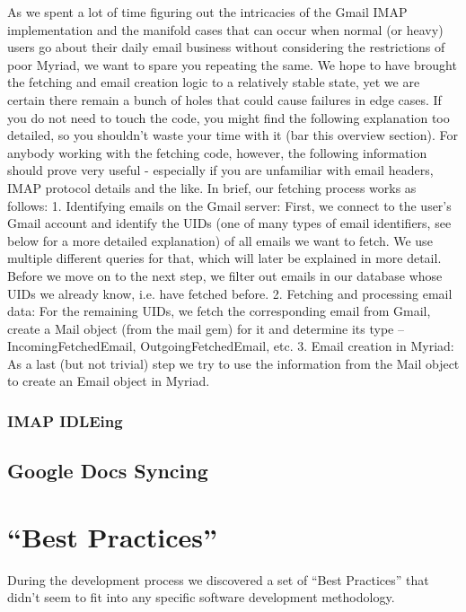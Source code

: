 As we spent a lot of time figuring out the intricacies of the Gmail IMAP implementation and the manifold cases that can occur when normal (or heavy) users go about their daily email business without considering the restrictions of poor Myriad, we want to spare you repeating the same. We hope to have brought the fetching and email creation logic to a relatively stable state, yet we are certain there remain a bunch of holes that could cause failures in edge cases.
If you do not need to touch the code, you might find the following explanation too detailed, so you shouldn't waste your time with it (bar this overview section). For anybody working with the fetching code, however, the following information should prove very useful - especially if you are unfamiliar with email headers, IMAP protocol details and the like.
In brief, our fetching process works as follows:
1.	Identifying emails on the Gmail server: First, we connect to the user's Gmail account and identify the UIDs (one of many types of email identifiers, see below for a more detailed explanation) of all emails we want to fetch. We use multiple different queries for that, which will later be explained in more detail. Before we move on to the next step, we filter out emails in our database whose UIDs we already know, i.e. have fetched before.
2.	Fetching and processing email data: For the remaining UIDs, we fetch the corresponding email from Gmail, create a Mail object (from the mail gem) for it and determine its type – IncomingFetchedEmail, OutgoingFetchedEmail, etc.
3.	Email creation in Myriad: As a last (but not trivial) step we try to use the information from the Mail object to create an Email object in Myriad.

\subsubsection{IMAP IDLEing}



\subsection{Google Docs Syncing}




\section{``Best Practices''}

During the development process we discovered a set of ``Best Practices'' that didn't seem to fit into any specific software development methodology.

